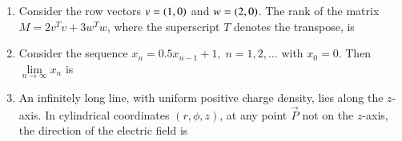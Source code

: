 \documentclass[journal,12pt,onecolumn]{IEEEtran}
\theoremstyle{remark}
\begin{document}
\begin{enumerate}
\item Consider the row vectors $v =\left(1,0\right)$ and $w =\left(2,0\right)$. The rank of the matrix $M = 2v^Tv + 3w^T w$, where the superscript $T$ denotes the transpose, is \par \hfill{}
\begin{enumerate}
\end{enumerate}

\item Consider the sequence $x_n = 0.5x_{n-1}+1, \; n = 1, 2, \dots$ with $x_0=0$. Then  
$\lim\limits_{n\to\infty} x_n$ is \par \hfill{}
\begin{enumerate}
\end{enumerate}

\item An infinitely long line, with uniform positive charge density, lies along the $z$-axis. In cylindrical coordinates $(r, \phi, z)$, at any point $\Vec{P}$ not on the $z$-axis, the direction of the electric field is \par \hfill{}
\begin{enumerate}
\end{enumerate}


\end{enumerate}
\end{document}
